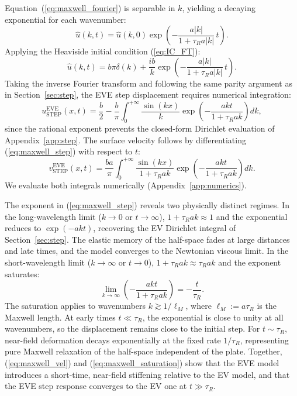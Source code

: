 \documentclass[extra]{gji}
\begin{document}
Equation~(\ref{eq:maxwell_fourier}) is separable in $k$, yielding a decaying
exponential for each wavenumber:
\begin{equation}
\hat{u}(k,t) = \hat{u}(k,0)\exp\!\left(-\frac{a|k|}{1+\tau_R a|k|}\,t\right).
\label{eq:maxwell_fourier_sol}
\end{equation}
Applying the Heaviside initial condition (\ref{eq:IC_FT}):
\begin{equation}
\hat{u}(k,t) = b\pi\delta(k)
  + \frac{ib}{k}\exp\!\left(-\frac{a|k|}{1+\tau_R a|k|}\,t\right).
\label{eq:maxwell_IC_evolved}
\end{equation}
Taking the inverse Fourier transform and following the same parity argument as
in Section~\ref{sec:step}, the EVE step displacement requires numerical
integration:
\begin{equation}
u_{\text{STEP}}^{\text{EVE}}(x,t) = \frac{b}{2}
  - \frac{b}{\pi}\int_0^{+\infty}
    \frac{\sin(kx)}{k}\exp\!\left(-\frac{akt}{1+\tau_R ak}\right)dk,
\label{eq:maxwell_step}
\end{equation}
since the rational exponent prevents the closed-form Dirichlet evaluation of
Appendix~\ref{app:step}. The surface velocity follows by differentiating
(\ref{eq:maxwell_step}) with respect to $t$:
\begin{equation}
v_{\text{STEP}}^{\text{EVE}}(x,t) = \frac{b a}{\pi}\int_0^{+\infty}
  \frac{\sin(kx)}{1+\tau_R ak}
  \exp\!\left(-\frac{akt}{1+\tau_R ak}\right)dk.
\label{eq:maxwell_vel}
\end{equation}
We evaluate both integrals numerically (Appendix~\ref{app:numerics}).

The exponent in (\ref{eq:maxwell_step}) reveals two physically distinct regimes.
In the long-wavelength limit ($k\to 0$ or $t\to\infty$), $1+\tau_R ak \approx 1$
and the exponential reduces to $\exp(-akt)$, recovering the EV
Dirichlet integral of Section~\ref{sec:step}. The elastic memory of the
half-space fades at large distances and late times, and the model converges
to the Newtonian viscous limit. In the short-wavelength limit ($k\to\infty$ or
$t\to 0$), $1+\tau_R ak \approx \tau_R ak$ and the exponent saturates:
\begin{equation}
\lim_{k\to\infty}\left(-\frac{akt}{1+\tau_R ak}\right) = -\frac{t}{\tau_R}.
\label{eq:maxwell_saturation}
\end{equation}
The saturation applies to wavenumbers $k \gtrsim 1/\ell_M$, where
$\ell_M := a\tau_R$ is the Maxwell length. At early times $t\ll\tau_R$, the exponential is close to unity at all
wavenumbers, so the displacement remains close to the initial step. For $t\sim\tau_R$, near-field
deformation decays exponentially at the fixed rate $1/\tau_R$, representing
pure Maxwell relaxation of the half-space independent of the plate.
Together, (\ref{eq:maxwell_vel}) and (\ref{eq:maxwell_saturation}) show
that the EVE model introduces a short-time, near-field stiffening relative
to the EV model, and that the EVE step response converges to the EV one
at $t\gg\tau_R$.
\end{document}
